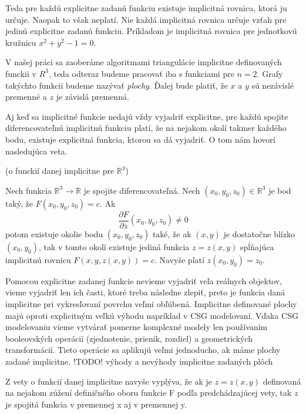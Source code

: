 Teda pre každú explicitne zadanú funkciu existuje implicitná rovnica, ktorá ju určuje.
Naopak to však neplatí. Nie každá implicitná rovnica určuje vzťah pre jedinú explicitne zadanú
funkciu. Príkladom je implicitná rovnica pre jednotkovú kružnicu $x^2 + y^2 - 1 = 0$. 


V našej práci sa zaoberáme algoritmami triangulácie implicitne definovaných funckii v $R^3$, teda odteraz
budeme pracovať iba s funkciami pre $n = 2$. Grafy takýchto funkcii budeme nazývať \textit{plochy}. 
Ďalej bude platiť, že $x$ a $y$ sú nezávislé premenné a $z$ je závislá premenná.


Aj keď sa implicitné funkcie nedajú vždy vyjadriť explicitne, pre každú spojite diferencovateľnú
implicitnú funkciu platí, že na nejakom okolí takmer každého bodu, existuje explicitná funkcia,
ktorou sa dá vyjadriť.
O tom nám hovorí nasledujúca veta.





\begin{theorem}
 (o funckií danej implicitne pre $\mathbb{R}^3$)
 
 Nech funkcia $\mathbb{R}^3 \to \mathbb{R}$ je spojite diferencovateľná. 
 Nech $(x_0, y_0, z_0) \in \mathbb{R}^3$ je bod taký, že $F(x_0, y_0, z_0) = c$.
 Ak $$\frac{\partial F}{\partial z} (x_0, y_0, z_0) \neq 0$$ potom existuje okolie 
 bodu $(x_0, y_0, z_0)$ také, že ak $(x, y)$ je dostatočne blízko $(x_0, y_0)$, 
 tak v tomto okolí existuje jediná funkcia $z = z(x ,y)$ spĺňajúca implicitnú rovnicu
 $F(x, y, z(x, y)) = c$. Navyše platí $z(x_0, y_0) = z_0$.
\end{theorem}

Pomocou explicitne zadanej funkcie nevieme vyjadriť veľa reálnych objektov, 
vieme vyjadriť len ich časti, ktoré treba následne zlepiť, 
preto je funkcia daná implicitne pri vykresľovaní povrchu veľmi obľúbená. 
Implicitne definované plochy majú oproti explicitným veľkú výhodu napríklad
v CSG modelovaní. Vďaka CSG modelovaniu vieme vytvárať pomerne komplexné
modely len používaním booleovských operácií (zjednotenie, prienik, rozdiel)
a geometrických transformácií. Tieto operácie sa aplikujú veľmi jednoducho, ak
máme plochy zadané implicitne.
!TODO! výhody a nevýhody implicitne zadaných plôch


\begin{note}
    Z vety o funkcií danej implicitne navyše vyplýva, že ak je $z = z(x,y)$ definovaná na nejakom 
    zúžení definičného oboru funkcie F podľa predchádzajúcej vety, tak $z$ je spojitá funkcia v 
    premennej x aj v premennej y. 
\end{note}

